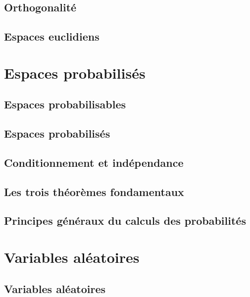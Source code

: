 \documentclass[11pt,twoside,a4paper]{article}
\begin{document}
\subsection{Orthogonalité}

\subsection{Espaces euclidiens}


\newpage
\section{Espaces probabilisés}

\subsection{Espaces probabilisables}



\bigskip



\subsection{Espaces probabilisés}

\subsection{Conditionnement et indépendance}

\subsection{Les trois théorèmes fondamentaux}

\subsection{Principes généraux du calculs des probabilités}

\newpage
\section{Variables aléatoires}

\subsection{Variables aléatoires}
\end{document}
